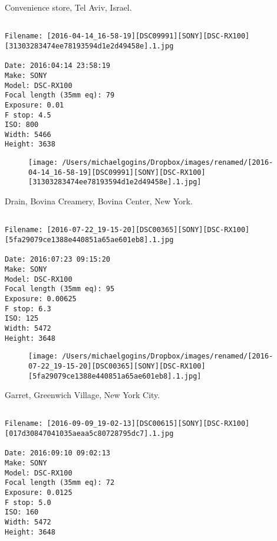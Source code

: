 \documentclass[11pt,letter,DIV=14,paper=landscape]{scrbook}
\begin{document}
\clearpage
\noindent Convenience store, Tel Aviv, Israel.
\noindent
\begin{lstlisting}

Filename: [2016-04-14_16-58-19][DSC09991][SONY][DSC-RX100][31303283474ee78193594d1e2d49458e].1.jpg

Date: 2016:04:14 23:58:19
Make: SONY
Model: DSC-RX100
Focal length (35mm eq): 79
Exposure: 0.01
F stop: 4.5
ISO: 800
Width: 5466
Height: 3638
\end{lstlisting}
\clearpage

\begin{figure}
\texttt{[image: /Users/michaelgogins/Dropbox/images/renamed/[2016-04-14\_16-58-19][DSC09991][SONY][DSC-RX100][31303283474ee78193594d1e2d49458e].1.jpg]}
\end{figure}
    
\clearpage
\noindent Drain, Bovina Creamery, Bovina Center, New York.
\noindent
\begin{lstlisting}

Filename: [2016-07-22_19-15-20][DSC00365][SONY][DSC-RX100][5fa29079ce1388e440851a65ae601eb8].1.jpg

Date: 2016:07:23 09:15:20
Make: SONY
Model: DSC-RX100
Focal length (35mm eq): 95
Exposure: 0.00625
F stop: 6.3
ISO: 125
Width: 5472
Height: 3648
\end{lstlisting}
\clearpage

\begin{figure}
\texttt{[image: /Users/michaelgogins/Dropbox/images/renamed/[2016-07-22\_19-15-20][DSC00365][SONY][DSC-RX100][5fa29079ce1388e440851a65ae601eb8].1.jpg]}
\end{figure}
    
\clearpage
\noindent Garret, Greenwich Village, New York City.
\noindent
\begin{lstlisting}

Filename: [2016-09-09_19-02-13][DSC00615][SONY][DSC-RX100][017d30847041035aeaa5c80728795dc7].1.jpg

Date: 2016:09:10 09:02:13
Make: SONY
Model: DSC-RX100
Focal length (35mm eq): 72
Exposure: 0.0125
F stop: 5.0
ISO: 160
Width: 5472
Height: 3648
\end{lstlisting}
\clearpage
\end{document}
